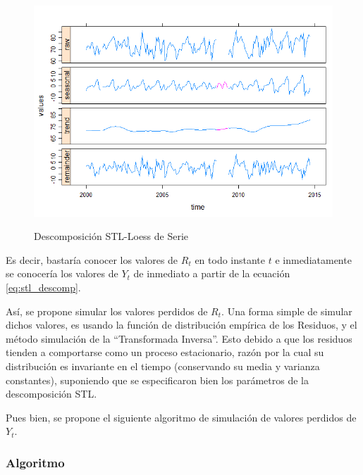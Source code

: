 \documentclass[12pt,oneside]{book}\usepackage[]{graphicx}\usepackage[]{color}
\theoremstyle{definition} %
\begin{document}
\begin{figure}[h]
\caption{Descomposición STL-Loess de Serie}
\includegraphics[width=15cm]{Cap2-Stl-Loess.png}
\label{fig:stl_descomp}
\centering
\end{figure}

Es decir, bastaría conocer los valores de $R_t$ en todo instante $t$ e inmediatamente se conocería los valores de $Y_t$ de inmediato a partir de la ecuación \eqref{eq:stl_descomp}.


Así, se propone simular los valores perdidos de $R_t$. Una forma simple de simular dichos valores, es usando la función de distribución empírica de los Residuos, y el método simulación de la ``Transformada Inversa''. Esto debido a que los residuos tienden a comportarse como un proceso estacionario, razón por la cual su distribución es invariante en el tiempo (conservando su media y varianza constantes), suponiendo que se especificaron bien los parámetros de la descomposición STL.


Pues bien, se propone el siguiente algoritmo de simulación de valores perdidos de $Y_t$.

\subsubsection{Algoritmo}
\end{document}
